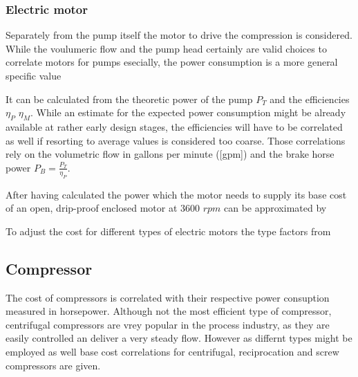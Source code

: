 			
		\subsubsection{Electric motor}
			Separately from the pump itself the motor to drive the compression is considered. While the
			voulumeric flow and the pump head certainly are valid choices to correlate motors for pumps 
			esecially, the power consumption is a more general specific value 
			
			It can be calculated from the theoretic power of the pump $P_T$ and the efficiencies $\eta_P$
			$\eta_M$. While an estimate for the expected power consumption might be already available at
			rather early design stages, the efficiencies will have to be correlated as well if resorting 
			to average values is considered too coarse. Those correlations rely on the volumetric flow in 
			gallons per minute ([gpm]) and the brake horse power $P_B = \frac{P_T}{\eta_P}$. 
			
			
			After having calculated the power which the motor needs to supply its base cost of an open, 
			drip-proof enclosed motor at 3600 $rpm$ can be approximated by
			
			To adjust the cost for different types of electric motors the type factors from 
			
	
	\subsection{Compressor}
		The cost of compressors is correlated with their respective power consuption measured in horsepower.
		Although not the most efficient type of compressor, centrifugal compressors are vrey popular in the
		process industry, as they are easily controlled an deliver a very steady flow. However as differnt 
		types might be employed as well base cost correlations for centrifugal, reciprocation and screw
		compressors are given. 
		
